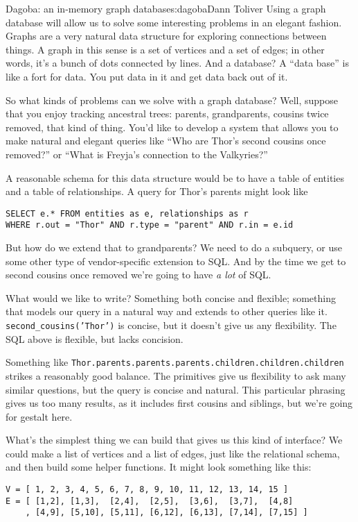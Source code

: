 \begin{aosachapter}{Dagoba: an in-memory graph database}{s:dagoba}{Dann Toliver}
Using a graph database will allow us to solve some interesting problems
in an elegant fashion. Graphs are a very natural data structure for
exploring connections between things. A graph in this sense is a set of
vertices and a set of edges; in other words, it's a bunch of dots
connected by lines. And a database? A ``data base'' is like a fort for
data. You put data in it and get data back out of it.

So what kinds of problems can we solve with a graph database? Well,
suppose that you enjoy tracking ancestral trees: parents, grandparents,
cousins twice removed, that kind of thing. You'd like to develop a
system that allows you to make natural and elegant queries like ``Who
are Thor's second cousins once removed?'' or ``What is Freyja's
connection to the Valkyries?''

A reasonable schema for this data structure would be to have a table of
entities and a table of relationships. A query for Thor's parents might
look like

\begin{verbatim}
SELECT e.* FROM entities as e, relationships as r
WHERE r.out = "Thor" AND r.type = "parent" AND r.in = e.id
\end{verbatim}

But how do we extend that to grandparents? We need to do a subquery, or
use some other type of vendor-specific extension to SQL. And by the time
we get to second cousins once removed we're going to have \emph{a lot}
of SQL.

What would we like to write? Something both concise and flexible;
something that models our query in a natural way and extends to other
queries like it. \texttt{second\_cousins('Thor')} is concise, but it
doesn't give us any flexibility. The SQL above is flexible, but lacks
concision.

Something like
\texttt{Thor.parents.parents.parents.children.children.children} strikes
a reasonably good balance. The primitives give us flexibility to ask
many similar questions, but the query is concise and natural. This
particular phrasing gives us too many results, as it includes first
cousins and siblings, but we're going for gestalt here.

What's the simplest thing we can build that gives us this kind of
interface? We could make a list of vertices and a list of edges, just
like the relational schema, and then build some helper functions. It
might look something like this:

\begin{verbatim}
V = [ 1, 2, 3, 4, 5, 6, 7, 8, 9, 10, 11, 12, 13, 14, 15 ]
E = [ [1,2], [1,3],  [2,4],  [2,5],  [3,6],  [3,7],  [4,8]
    , [4,9], [5,10], [5,11], [6,12], [6,13], [7,14], [7,15] ]


\end{verbatim}
\end{aosachapter}
